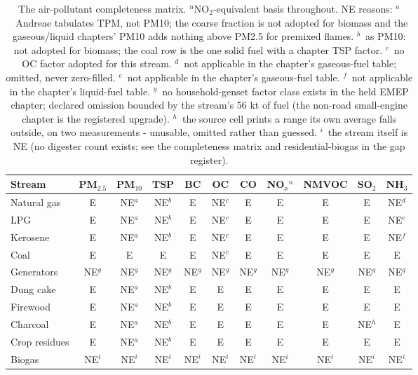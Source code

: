 \begin{table}[htbp]
\centering
\scriptsize
\setlength{\tabcolsep}{4pt}
\begin{tabular}{@{}lcccccccccc@{}}
\toprule
\textbf{Stream} & PM$_{2.5}$ & PM$_{10}$ & TSP & BC & OC & CO & NO$_x$$^{n}$ & NMVOC & SO$_2$ & NH$_3$ \\
\midrule
Natural gas & E & NE$^{a}$ & NE$^{b}$ & E & NE$^{c}$ & E & E & E & E & NE$^{d}$ \\
LPG & E & NE$^{a}$ & NE$^{b}$ & E & NE$^{c}$ & E & E & E & E & NE$^{e}$ \\
Kerosene & E & NE$^{a}$ & NE$^{b}$ & E & NE$^{c}$ & E & E & E & E & NE$^{f}$ \\
Coal & E & E & E & E & NE$^{c}$ & E & E & E & E & E \\
Generators & NE$^{g}$ & NE$^{g}$ & NE$^{g}$ & NE$^{g}$ & NE$^{g}$ & NE$^{g}$ & NE$^{g}$ & NE$^{g}$ & NE$^{g}$ & NE$^{g}$ \\
Dung cake & E & NE$^{a}$ & NE$^{b}$ & E & E & E & E & E & E & E \\
Firewood & E & NE$^{a}$ & NE$^{b}$ & E & E & E & E & E & E & E \\
Charcoal & E & NE$^{a}$ & NE$^{b}$ & E & E & E & E & E & NE$^{h}$ & E \\
Crop residues & E & NE$^{a}$ & NE$^{b}$ & E & E & E & E & E & E & E \\
Biogas & NE$^{i}$ & NE$^{i}$ & NE$^{i}$ & NE$^{i}$ & NE$^{i}$ & NE$^{i}$ & NE$^{i}$ & NE$^{i}$ & NE$^{i}$ & NE$^{i}$ \\
\bottomrule
\end{tabular}
\caption{The air-pollutant completeness matrix. $^{n}$NO$_2$-equivalent
basis throughout. NE reasons:
$^{a}$~Andreae tabulates TPM, not PM10; the coarse fraction is not adopted for biomass and the gaseous/liquid chapters' PM10 adds nothing above PM2.5 for premixed flames.
$^{b}$~as PM10: not adopted for biomass; the coal row is the one solid fuel with a chapter TSP factor.
$^{c}$~no OC factor adopted for this stream.
$^{d}$~not applicable in the chapter's gaseous-fuel table; omitted, never zero-filled.
$^{e}$~not applicable in the chapter's gaseous-fuel table.
$^{f}$~not applicable in the chapter's liquid-fuel table.
$^{g}$~no household-genset factor class exists in the held EMEP chapter; declared omission bounded by the stream's 56 kt of fuel (the non-road small-engine chapter is the registered upgrade).
$^{h}$~the source cell prints a range its own average falls outside, on two measurements - unusable, omitted rather than guessed.
$^{i}$~the stream itself is NE (no digester count exists; see the completeness matrix and residential-biogas in the gap register).
}
\label{tab:airmatrix}
\end{table}

